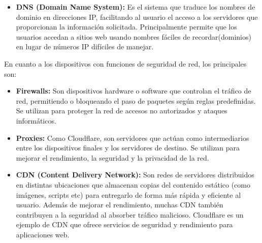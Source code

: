 \begin{itemize}
	\item \textbf{DNS (Domain Name System):} Es el sistema que traduce los nombres de dominio en direcciones IP, facilitando al usuario el acceso a los servidores que proporcionan la información solicitada. Principalmente permite que los usuarios accedan a sitios web usando nombres fáciles de recordar(dominios) en lugar de números IP difíciles de manejar.

\end{itemize}


En cuanto a los dispositivos con funciones de seguridad de red, los principales son:
\begin{itemize}
	\item \textbf{Firewalls:} Son dispositivos hardware o software que controlan el tráfico de red, permitiendo o bloqueando el paso de paquetes según reglas predefinidas. Se utilizan para proteger la red de accesos no autorizados y ataques informáticos. ~\cite{SushilJajodia2025}

	\item \textbf{Proxies:} Como Cloudflare, son servidores que actúan como intermediarios entre los dispositivos finales y los servidores de destino. Se utilizan para mejorar el rendimiento, la seguridad y la privacidad de la red. ~\cite{SushilJajodia2025}

	\item \textbf{CDN (Content Delivery Network):} Son redes de servidores distribuidos en distintas ubicaciones que almacenan copias del contenido estático (como imágenes, scripts etc) para entregarlo de forma más rápida y eficiente al usuario. Además de mejorar el rendimiento, muchas CDN también contribuyen a la seguridad al absorber tráfico malicioso. Cloudflare es un ejemplo de CDN que ofrece servicios de seguridad y rendimiento para aplicaciones web.
\end{itemize}

